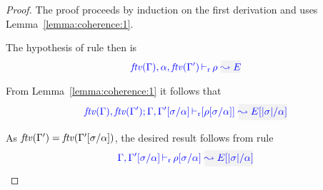{\centering
{}}

\begin{proof}
  The proof proceeds by induction on the first derivation and uses Lemma~\ref{lemma:coherence:1}.
  
  The hypothesis of rule  then is
\begin{equation*}
  \dres{\ftv{\tenv},\alpha,\ftv{\tenv'}}{\rulet}{E}
\end{equation*}

  From Lemma~\ref{lemma:coherence:1} it follows that
\begin{equation*}
  \drres{\ftv{\tenv},\ftv{\tenv'}}{\tenv,\tenv'[\suty/\alpha]}{\rulet[\suty/\alpha]}{E[|\suty|/\alpha]}
\end{equation*}

  As ${\it ftv }(\Gamma') = {\it ftv }(\Gamma'[\sigma/\alpha])$, the desired result follows from rule
\begin{equation*}
 \dres{\tenv,\tenv'[\suty/\alpha]}{\rulet[\suty/\alpha]}{E[|\suty|/\alpha]}
\end{equation*}
\end{proof}

